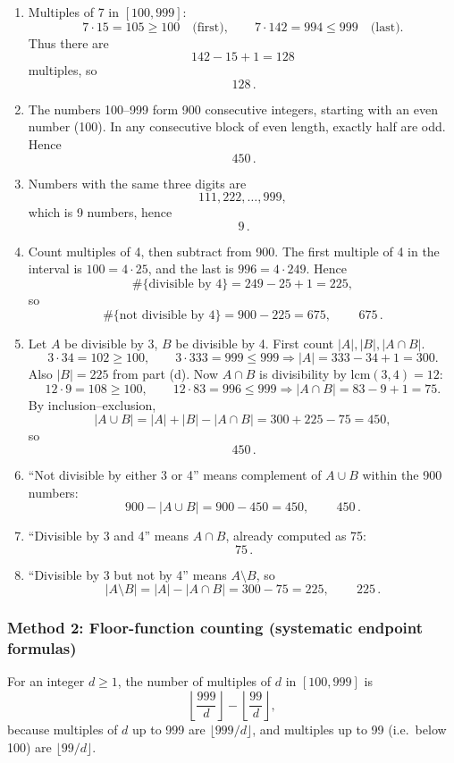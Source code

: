 \documentclass[12pt]{article}
\begin{document}
\begin{enumerate}[label=(\alph*)]
\item Multiples of 7 in $[100,999]$:
\[
7\cdot 15=105\ge 100 \quad\text{(first)},\qquad 7\cdot 142=994\le 999 \quad\text{(last)}.
\]
Thus there are
\[
142-15+1 = 128
\]
multiples, so
\[
\boxed{\,128\,}.
\]

\item The numbers 100--999 form 900 consecutive integers, starting with an even number (100). In any consecutive block of even length, exactly half are odd. Hence
\[
\boxed{\,450\,}.
\]

\item Numbers with the same three digits are
\[
111,222,\dots,999,
\]
which is 9 numbers, hence
\[
\boxed{\,9\,}.
\]

\item Count multiples of 4, then subtract from 900.
The first multiple of 4 in the interval is $100=4\cdot 25$, and the last is $996=4\cdot 249$. Hence
\[
\#\{\text{divisible by 4}\} = 249-25+1=225,
\]
so
\[
\#\{\text{not divisible by 4}\} = 900-225=675,
\qquad
\boxed{\,675\,}.
\]

\item Let $A$ be divisible by 3, $B$ be divisible by 4.
First count $|A|,|B|,|A\cap B|$.
\[
3\cdot 34=102\ge 100,\qquad 3\cdot 333=999\le 999 \Rightarrow |A|=333-34+1=300.
\]
Also $|B|=225$ from part (d).
Now $A\cap B$ is divisibility by $\mathrm{lcm}(3,4)=12$:
\[
12\cdot 9=108\ge 100,\qquad 12\cdot 83=996\le 999 \Rightarrow |A\cap B|=83-9+1=75.
\]
By inclusion--exclusion,
\[
|A\cup B| = |A|+|B|-|A\cap B| = 300+225-75 = 450,
\]
so
\[
\boxed{\,450\,}.
\]

\item ``Not divisible by either 3 or 4'' means complement of $A\cup B$ within the 900 numbers:
\[
900-|A\cup B| = 900-450=450,
\qquad
\boxed{\,450\,}.
\]

\item ``Divisible by 3 and 4'' means $A\cap B$, already computed as 75:
\[
\boxed{\,75\,}.
\]

\item ``Divisible by 3 but not by 4'' means $A\setminus B$, so
\[
|A\setminus B| = |A|-|A\cap B| = 300-75=225,
\qquad
\boxed{\,225\,}.
\]
\end{enumerate}

\subsubsection{Method 2: Floor-function counting (systematic endpoint formulas)}
For an integer $d\ge 1$, the number of multiples of $d$ in $[100,999]$ is
\[
\left\lfloor \frac{999}{d}\right\rfloor - \left\lfloor \frac{99}{d}\right\rfloor,
\]
because multiples of $d$ up to 999 are $\lfloor 999/d\rfloor$, and multiples up to 99 (i.e.\ below 100) are $\lfloor 99/d\rfloor$.
\end{document}
